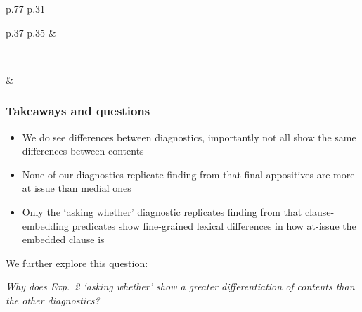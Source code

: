 \documentclass[compress, xcolor = dvipsnames, aspectratio=169]{beamer}
\begin{document}
\begin{frame}[t]
\begin{minipage}{\textwidth}
\begin{minipage}{\textwidth}
\begin{tabular}{p{.77\textwidth} p{.31\textwidth}}
\begin{tabular}{p{.37\textwidth} p{.35\textwidth}}
		      		&
						\parbox{\linewidth}{
						\vspace{.2cm}
						\vspace{.1cm}}
		      		\\
				\end{tabular}

				&
				\\ 
			\end{tabular}
		\end{minipage}
		\end{minipage}
	
	\end{frame}

	\begin{frame}\frametitle{Takeaways and questions}
		\begin{itemize}
			\item We do see differences between diagnostics, importantly not all show the same differences between contents\pause

			\item None of our diagnostics replicate finding from \citet{syrett_experimental_2015} that final appositives are more at issue than medial ones\pause

			\item Only the `asking whether' diagnostic replicates finding from \citealt{degen-tonhauser-glossa} that clause-embedding predicates show fine-grained lexical differences in how at-issue the embedded clause is\pause

		\end{itemize}	\bigskip 

		We further explore this question:

		\begin{center}
			\emph{Why does Exp.~2 `asking whether' show a greater differentiation of contents than the other diagnostics?}
		\end{center}
		
	\end{frame}
\end{document}
